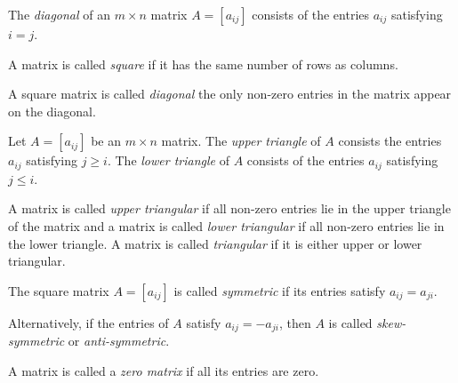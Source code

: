 \begin{SaveDefinition}[key=Diagonal, title={Diagonal}]
	The \emph{diagonal} of an $m\times n$ matrix $A=[a_{ij}]$ consists of
	the entries $a_{ij}$ satisfying $i=j$.
\end{SaveDefinition}
\begin{SaveDefinition}[key=SquareMatrix, title={Square Matrix}]
	A matrix is called \emph{square} if it has the same
	number of rows as columns.
\end{SaveDefinition}
\begin{SaveDefinition}[key=DiagonalMatrix, title={Diagonal Matrix}]
	A square matrix is called \emph{diagonal} the only non-zero
	entries in the matrix appear on the diagonal.
\end{SaveDefinition}
\begin{SaveDefinition}[key=TriangleOf, title={Upper \& Lower Triangle}]
	Let $A=[a_{ij}]$ be an $m\times n$ matrix. The \emph{upper triangle}
	of $A$ consists the entries $a_{ij}$
	satisfying $j\geq i$. The \emph{lower triangle}
	of $A$ consists of the entries $a_{ij}$ satisfying $j\leq i$.
\end{SaveDefinition}
\begin{SaveDefinition}[key=TriangularMatrix, title={Triangular Matrices}]
	A matrix is called \emph{upper triangular} if all non-zero entries lie in the upper triangle of the matrix and
	a matrix is called \emph{lower triangular} if all non-zero entries lie in the lower triangle. A matrix is
	called \emph{triangular} if it is either upper or lower triangular.
\end{SaveDefinition}
\begin{SaveDefinition}[key=SymmetricMatrix, title={Symmetric Matrix}]
	The square matrix $A=[a_{ij}]$ is called \emph{symmetric} if its
	entries satisfy $a_{ij}=a_{ji}$.

	Alternatively, if the entries of $A$ satisfy $a_{ij}=-a_{ji}$, then $A$
	is called \emph{skew-symmetric} or \emph{anti-symmetric}.
\end{SaveDefinition}
\begin{SaveDefinition}[key=ZeroMatrix, title={Zero Matrix}]
	A matrix is called a \emph{zero matrix} if all its entries are zero.
\end{SaveDefinition}
